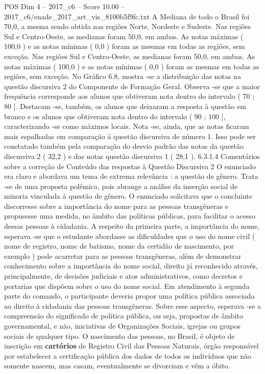 \begin{textsample}{POS Dim 4 – 2017\_c6 – Score 10.00 – 2017\_c6/enade\_2017\_art\_vis\_8100b5f9fc.txt}
A Mediana de todo o Brasil foi 70,0, a mesma sendo obtida nas regiões Norte, Nordeste e Sudeste.
Nas regiões Sul e Centro-Oeste, as medianas foram 50,0, em ambas.
As notas máximas ( 100,0 ) e as notas mínimas ( 0,0 ) foram as mesmas em todas as regiões, sem exceção.
Nas regiões Sul e Centro-Oeste, as medianas foram 50,0, em ambas.
As notas máximas ( 100,0 ) e as notas mínimas ( 0,0 ) foram as mesmas em todas as regiões, sem exceção.
No Gráfico 6.8, mostra -se a distribuição das notas na questão discursiva 2 do Componente de Formação Geral.
Observa -se que a maior frequência corresponde aos alunos que obtiveram nota dentro do intervalo ( 70 ; 80 ].
Destacam -se, também, os alunos que deixaram a resposta à questão em branco e os alunos que obtiveram nota dentro do intervalo ( 90 ; 100 ], caracterizando -se como máximos locais.
Nota -se, ainda, que as notas ficaram mais espalhadas em comparação à questão discursiva de número 1.
Isso pode ser constatado também pela comparação do desvio padrão das notas da questão discursiva 2 ( 32,2 ) e das notas questão discursiva 1 ( 28,1 ). 6.3.1.4 Comentários sobre a correção de Conteúdo das respostas à Questão Discursiva 2 O enunciado era claro e abordava um tema de extrema relevância : a questão de gênero.
Trata -se de uma proposta polêmica, pois abrange a análise da inserção social de minoria vinculada à questão de gênero.
O enunciado solicitava que o concluinte discorresse sobre a importância do nome para as pessoas transgêneras e propusesse uma medida, no âmbito das políticas públicas, para facilitar o acesso dessas pessoas à cidadania.
A respeito da primeira parte, a importância do nome, esperava -se que o estudante abordasse as dificuldades que o uso do nome civil ( nome de registro, nome de batismo, nome da certidão de nascimento, por exemplo ) pode acarretar para as pessoas transgêneras, além de demonstrar conhecimento sobre a importância do nome social, direito já reconhecido através, principalmente, de decisões judiciais e atos administrativos, como decretos e portarias que dispõem sobre o uso do nome social.
Em atendimento à segunda parte do comando, o participante deveria propor uma política pública associada ao direito à cidadania das pessoas transgêneras.
Sobre esse aspecto, esperava -se a compreensão do significado de política pública, ou seja, propostas de âmbito governamental, e não, iniciativas de Organizações Sociais, igrejas ou grupos sociais de qualquer tipo.
O nascimento das pessoas, no Brasil, é objeto de inscrição em \textbf{cartórios} de Registro Civil das Pessoas Naturais, órgão responsável por estabelecer a certificação pública dos dados de todos os indivíduos que não somente nascem, mas casam, eventualmente se divorciam e vêm a óbito.

\end{textsample}
